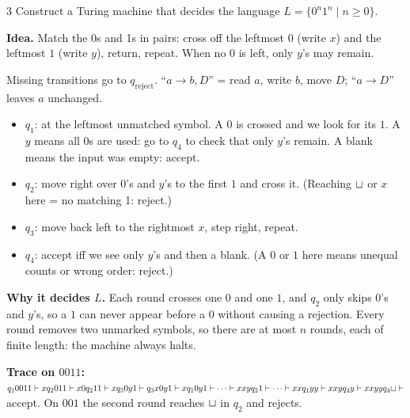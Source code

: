 \begin{question}{3}
Construct a Turing machine that decides the language $L=\{0^n1^n\mid n\ge 0\}$.
\end{question}
\begin{soln}
\textbf{Idea.} Match the 0s and 1s in pairs: cross off the leftmost $0$ (write $x$) and the leftmost $1$ (write $y$), return, repeat. When no $0$ is left, only $y$'s may remain.

\begin{center}

{\footnotesize Missing transitions go to $q_{\mathrm{reject}}$. ``$a\to b,D$'' = read $a$, write $b$, move $D$; ``$a\to D$'' leaves $a$ unchanged.}
\end{center}

\begin{itemize}
\item $q_1$: at the leftmost unmatched symbol. A $0$ is crossed and we look for its $1$. A $y$ means all 0s are used: go to $q_4$ to check that only $y$'s remain. A blank means the input was empty: accept.
\item $q_2$: move right over $0$'s and $y$'s to the first $1$ and cross it. (Reaching $\sqcup$ or $x$ here = no matching 1: reject.)
\item $q_3$: move back left to the rightmost $x$, step right, repeat.
\item $q_4$: accept iff we see only $y$'s and then a blank. (A $0$ or $1$ here means unequal counts or wrong order: reject.)
\end{itemize}

\textbf{Why it decides $L$.} Each round crosses one $0$ and one $1$, and $q_2$ only skips $0$'s and $y$'s, so a $1$ can never appear before a $0$ without causing a rejection. Every round removes two unmarked symbols, so there are at most $n$ rounds, each of finite length: the machine always halts.

\textbf{Trace on $0011$:}
$q_1 0011\vdash x q_2 011\vdash x0q_2 11\vdash xq_3 0y1\vdash q_3x0y1\vdash xq_1 0y1\vdash\cdots\vdash xxyq_2 1\vdash\cdots\vdash xxq_1 yy\vdash xxyq_4y\vdash xxyyq_4\sqcup\vdash$ accept.
On $001$ the second round reaches $\sqcup$ in $q_2$ and rejects.
\end{soln}

